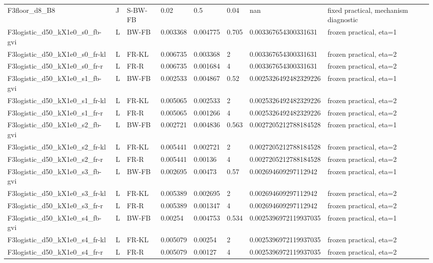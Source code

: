 \begin{tabular}{llllllll}
F3floor\_d8\_B8 & J & S-BW-FB & 0.02 & 0.5 & 0.04 & nan & fixed practical, mechanism diagnostic \\
F3logistic\_d50\_kX1e0\_s0\_fb-gvi & L & BW-FB & 0.003368 & 0.004775 & 0.705 & 0.003367654300331631 & frozen practical, eta=1 \\
F3logistic\_d50\_kX1e0\_s0\_fr-kl & L & FR-KL & 0.006735 & 0.003368 & 2 & 0.003367654300331631 & frozen practical, eta=2 \\
F3logistic\_d50\_kX1e0\_s0\_fr-r & L & FR-R & 0.006735 & 0.001684 & 4 & 0.003367654300331631 & frozen practical, eta=2 \\
F3logistic\_d50\_kX1e0\_s1\_fb-gvi & L & BW-FB & 0.002533 & 0.004867 & 0.52 & 0.0025326492482329226 & frozen practical, eta=1 \\
F3logistic\_d50\_kX1e0\_s1\_fr-kl & L & FR-KL & 0.005065 & 0.002533 & 2 & 0.0025326492482329226 & frozen practical, eta=2 \\
F3logistic\_d50\_kX1e0\_s1\_fr-r & L & FR-R & 0.005065 & 0.001266 & 4 & 0.0025326492482329226 & frozen practical, eta=2 \\
F3logistic\_d50\_kX1e0\_s2\_fb-gvi & L & BW-FB & 0.002721 & 0.004836 & 0.563 & 0.0027205212788184528 & frozen practical, eta=1 \\
F3logistic\_d50\_kX1e0\_s2\_fr-kl & L & FR-KL & 0.005441 & 0.002721 & 2 & 0.0027205212788184528 & frozen practical, eta=2 \\
F3logistic\_d50\_kX1e0\_s2\_fr-r & L & FR-R & 0.005441 & 0.00136 & 4 & 0.0027205212788184528 & frozen practical, eta=2 \\
F3logistic\_d50\_kX1e0\_s3\_fb-gvi & L & BW-FB & 0.002695 & 0.00473 & 0.57 & 0.002694609297112942 & frozen practical, eta=1 \\
F3logistic\_d50\_kX1e0\_s3\_fr-kl & L & FR-KL & 0.005389 & 0.002695 & 2 & 0.002694609297112942 & frozen practical, eta=2 \\
F3logistic\_d50\_kX1e0\_s3\_fr-r & L & FR-R & 0.005389 & 0.001347 & 4 & 0.002694609297112942 & frozen practical, eta=2 \\
F3logistic\_d50\_kX1e0\_s4\_fb-gvi & L & BW-FB & 0.00254 & 0.004753 & 0.534 & 0.0025396972119937035 & frozen practical, eta=1 \\
F3logistic\_d50\_kX1e0\_s4\_fr-kl & L & FR-KL & 0.005079 & 0.00254 & 2 & 0.0025396972119937035 & frozen practical, eta=2 \\
F3logistic\_d50\_kX1e0\_s4\_fr-r & L & FR-R & 0.005079 & 0.00127 & 4 & 0.0025396972119937035 & frozen practical, eta=2 \\

\end{tabular}
